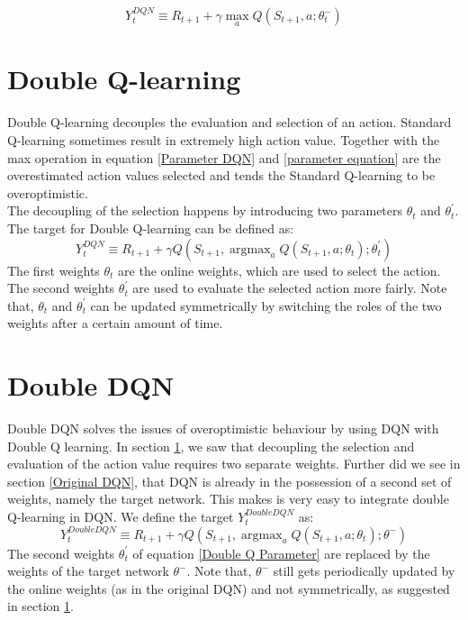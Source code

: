 \documentclass{sig-alternate}
\DeclareMathOperator*{\argmax}{argmax} %
\begin{document}
\begin{equation}
\label{Parameter DQN}
Y_{t}^{DQN} \equiv R_{t+1} + \gamma \max_{a}Q(S_{t+1},a;\theta_{t}^{-})
\end{equation}



\section{Double Q-learning}\label{Double Q-learning}

Double Q-learning \cite{hasselt2010double} decouples the evaluation and selection of an action. Standard Q-learning sometimes result in extremely high action value. Together with the max operation in equation \ref{Parameter DQN} and \ref{parameter equation} are the overestimated action values selected and tends the Standard Q-learning to be overoptimistic.\cite{van2016deep}\\
\newline
The decoupling of the selection happens by introducing two parameters $\theta_{t}$ and $\theta_{t}^{'}$. The target for Double Q-learning can be defined as:
\begin{equation}
\label{Double Q Parameter}
Y_{t}^{DQN} \equiv R_{t+1} + \gamma Q(S_{t+1},\argmax_{a}Q(S_{t+1},a;\theta_{t});\theta_{t}^{'})
\end{equation}
The first weights $\theta_{t}$ are the online weights, which are used to select the action. The second weights $\theta_{t}^{'}$ are used to evaluate the selected action more fairly.
Note that,  $\theta_{t}$ and $\theta_{t}^{'}$ can be updated symmetrically by switching the roles of the two weights after a certain amount of time.

\section{Double DQN}

Double DQN solves the issues of overoptimistic behaviour by using DQN with Double Q learning.
In section \ref{Double Q-learning}, we saw that decoupling the selection and evaluation of the action value requires two separate weights. Further did we see in section \ref{Original DQN}, that DQN is already in the possession of a second set of weights, namely the target network. This makes is very easy to integrate double Q-learning in DQN. We define the target $Y_{t}^{Double DQN}$ as:
\begin{equation}
\label{Double DQN}
Y_{t}^{Double DQN} \equiv R_{t+1} + \gamma Q(S_{t+1},\argmax _{a}Q(S_{t+1},a;\theta_{t});\theta^{-})
\end{equation}
The second weights $\theta_{t}^{'}$ of equation \ref{Double Q Parameter} are replaced by the weights of the target network $\theta^{-}$. Note that, $\theta^{-}$ still gets periodically updated by the online weights (as in the original DQN) and not symmetrically, as suggested in section \ref{Double Q-learning}. \\
\end{document}
